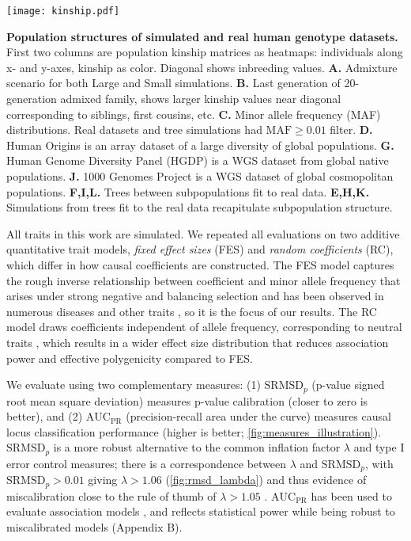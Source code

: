 \documentclass[11pt]{article}
\newcommand{\rmsd}{\text{SRMSD}_p}
\newcommand{\auc}{\text{AUC}_\text{PR}}
\begin{document}
\begin{FPfigure}%
  \centering
  \texttt{[image: kinship.pdf]}
  \caption{
    {\bf Population structures of simulated and real human genotype datasets.}
    First two columns are population kinship matrices as heatmaps: individuals along x- and y-axes, kinship as color.
    Diagonal shows inbreeding values.
    \textbf{A.}
    Admixture scenario for both Large and Small simulations.
    \textbf{B.}
    Last generation of 20-generation admixed family, shows larger kinship values near diagonal corresponding to siblings, first cousins, etc.
    \textbf{C.}
    Minor allele frequency (MAF) distributions.
    Real datasets and tree simulations had $\text{MAF} \ge 0.01$ filter.
    \textbf{D.}
    Human Origins is an array dataset of a large diversity of global populations.
    \textbf{G.}
    Human Genome Diversity Panel (HGDP) is a WGS dataset from global native populations.
    \textbf{J.}
    1000 Genomes Project is a WGS dataset of global cosmopolitan populations.
    \textbf{F,I,L.}
    Trees between subpopulations fit to real data.
    \textbf{E,H,K.}
    Simulations from trees fit to the real data recapitulate subpopulation structure.
  }
  \label{fig:kinship}
\end{FPfigure}

All traits in this work are simulated.
We repeated all evaluations on two additive quantitative trait models, \textit{fixed effect sizes} (FES) and \textit{random coefficients} (RC), which differ in how causal coefficients are constructed.
The FES model captures the rough inverse relationship between coefficient and minor allele frequency that arises under strong negative and balancing selection and has been observed in numerous diseases and other traits \citep{park_distribution_2011, zeng_signatures_2018, simons_population_2018, oconnor_extreme_2019}, so it is the focus of our results.
The RC model draws coefficients independent of allele frequency, corresponding to neutral traits \citep{zeng_signatures_2018, simons_population_2018}, which results in a wider effect size distribution that reduces association power and effective polygenicity compared to FES.

We evaluate using two complementary measures:
(1) $\rmsd$ (p-value signed root mean square deviation) measures p-value calibration (closer to zero is better), and
(2) $\auc$ (precision-recall area under the curve) measures causal locus classification performance (higher is better; \cref{fig:measures_illustration}).
$\rmsd$ is a more robust alternative to the common inflation factor $\lambda$ and type I error control measures; there is a correspondence between $\lambda$ and $\rmsd$, with $\rmsd > 0.01$ giving $\lambda > 1.06$ (\cref{fig:rmsd_lambda}) and thus evidence of miscalibration close to the rule of thumb of $\lambda > 1.05$ \citep{price_new_2010}.
$\auc$ has been used to evaluate association models \citep{rakitsch_lasso_2013}, and reflects statistical power while being robust to miscalibrated models (Appendix B).
\end{document}
